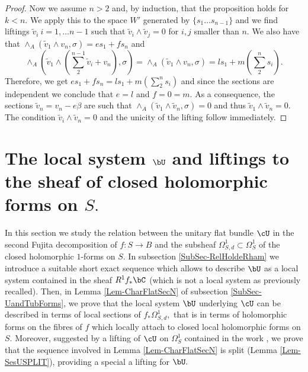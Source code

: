 \documentclass[a4paper,11pt]{amsart}
\DeclareMathOperator{\Crit}{Crit}
\begin{document}
{\begin{proof}
	Now we assume $n>2$ and, by induction, that the proposition holds for $k<n.$ We apply this to the space $W'$
	generated by $\{s_1\dots s_{n-1}\}$ and we find liftings $\tilde v_i\ i=1,\dots n-1$ such that $\tilde v_i\wedge \tilde v_j=0$ for
	$i, j$ smaller than $n.$	We also have that $\wedge_A (\tilde v_1\wedge v_n,\sigma)= es_1+fs_n$ and 
	$$\wedge_A (\tilde v_1 \wedge( \sum _2^{n-1}\tilde v_i+ v_n),\sigma)=\wedge_A  (\tilde v_1\wedge v_n,\sigma)=
	ls_1+m (\sum _2^ns_i).$$
	Therefore, we get  $es_1+fs_n=ls_1+ m(\sum _2^ns_i)$ and  since the sections are independent we conclude that $e=l$ and $f=0=m.$
	As a consequence, the sections $\tilde v_n=v_n-e\beta$ are such that $\wedge_A ( \tilde v_1\wedge\tilde v_n,\sigma)=0$ and thus 
	$\tilde v_1\wedge\tilde v_n=0.$ The condition $\tilde v_i\wedge\tilde v_n=0$ and the unicity of the lifting follow immediately.
	
		          	 		 
         	 	\end{proof}         	 	

      	  
\section{The local system $\bU$ and liftings to the sheaf of closed holomorphic forms on $S.$}\label{Sec-LiftingsOnU}
 
 In this section we study the relation between the unitary flat bundle $\cU$ in the second Fujita decomposition of $f:S\to B$ and the subsheaf $\Omega^1_{S,d}\subset \Omega^1_S$ of the closed holomorphic $1$-forms on $S.$ In subsection \ref{SubSec-RelHoldeRham} we introduce a suitable short exact sequence which allows to describe $\bU$ as a local system contained in the sheaf $R^1f_*\bC$ (which is not a local system as previously recalled). Then, in Lemma \ref{Lem-CharFlatSecN} of subsection \ref{SubSec-UandTubForms}, we prove that the local system $\bU$ underlying $\cU$ can be described in terms of local sections of $f_*\Omega^1_{S,d},$ that is in terms of holomorphic forms on the fibres of $f$ which locally attach to closed local holomorphic forms on $S.$ Moreover, suggested by a lifting of $\cU$ on $\Omega^1_S$ contained in the work \cite{ChenLuZu_OnTheOort_2016}, we prove that the sequence involved in Lemma \ref{Lem-CharFlatSecN} is split (Lemma \ref{Lem-SesUSPLIT}), providing a special a lifting for $\bU.$

% 
  
}
\end{document}
